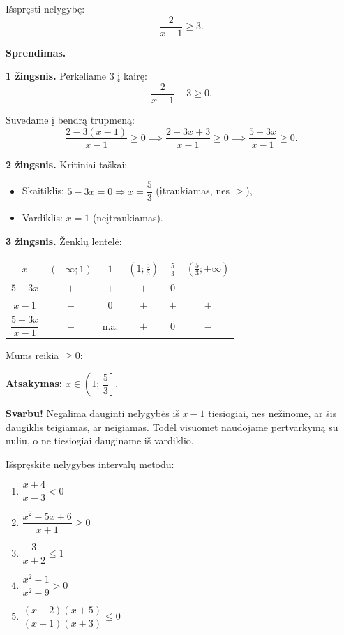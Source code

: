 \begin{example}
Išspręsti nelygybę:
\[
    \frac{2}{x-1} \geq 3.
\]

\textbf{Sprendimas.}

\textbf{1 žingsnis.} Perkeliame $3$ į kairę:
\[
    \frac{2}{x-1} - 3 \geq 0.
\]

Suvedame į bendrą trupmeną:
\[
    \frac{2 - 3(x-1)}{x-1} \geq 0 \implies \frac{2 - 3x + 3}{x-1} \geq 0 \implies \frac{5 - 3x}{x-1} \geq 0.
\]

\textbf{2 žingsnis.} Kritiniai taškai:
\begin{itemize}
    \item Skaitiklis: $5 - 3x = 0 \Rightarrow x = \dfrac{5}{3}$ (įtraukiamas, nes $\geq$),
    \item Vardiklis: $x = 1$ (neįtraukiamas).
\end{itemize}

\textbf{3 žingsnis.} Ženklų lentelė:

\begin{center}
\begin{tabular}{c|ccccc}
$x$ & $(-\infty;1)$ & $1$ & $\left(1;\frac{5}{3}\right)$ & $\frac{5}{3}$ & $\left(\frac{5}{3};+\infty\right)$ \\
\hline
$5-3x$ & $+$ & $+$ & $+$ & $0$ & $-$ \\
$x-1$ & $-$ & $0$ & $+$ & $+$ & $+$ \\
\hline
$\dfrac{5-3x}{x-1}$ & $-$ & n.a. & $+$ & $0$ & $-$ \\
\end{tabular}
\end{center}

Mums reikia $\geq 0$:

\textbf{Atsakymas:} $x \in \left(1;\, \dfrac{5}{3}\right]$.
\end{example}

\begin{remark}
\textbf{Svarbu!} Negalima dauginti nelygybės iš $x-1$ tiesiogiai, nes nežinome, ar šis daugiklis teigiamas, ar neigiamas. Todėl visuomet naudojame pertvarkymą su nuliu, o ne tiesiogiai dauginame iš vardiklio.
\end{remark}

\begin{exercise}
Išspręskite nelygybes intervalų metodu:
\begin{enumerate}[label=\alph*)]
    \item $\dfrac{x+4}{x-3} < 0$
    \item $\dfrac{x^2 - 5x + 6}{x+1} \geq 0$
    \item $\dfrac{3}{x+2} \leq 1$
    \item $\dfrac{x^2 - 1}{x^2 - 9} > 0$
    \item $\dfrac{(x-2)(x+5)}{(x-1)(x+3)} \leq 0$
\end{enumerate}
\end{exercise}

